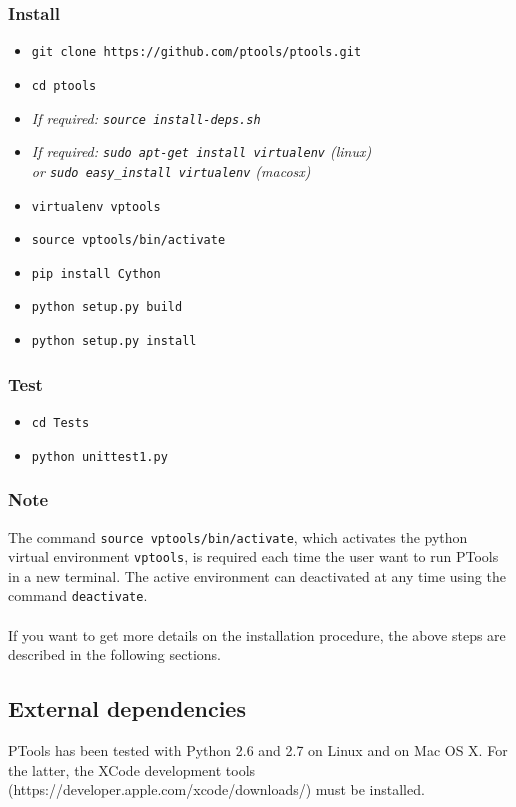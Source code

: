 \documentclass[12pt,a4paper]{article}
\begin{document}
\subsubsection*{Install}
\begin{itemize}
\item[] {\tt git clone https://github.com/ptools/ptools.git}
\item[]  {\tt cd ptools}
\item[] \textit{If required: {\tt source install-deps.sh}}
\item[] \textit{If required: {\tt sudo apt-get install virtualenv} (linux)\\ or {\tt sudo easy\_install virtualenv} (macosx)}
\item[] {\tt virtualenv vptools}
\item[] {\tt source vptools/bin/activate}
\item[] {\tt pip install Cython}
\item[] {\tt python setup.py build}
\item[] {\tt python setup.py install}
\end{itemize}

\subsubsection*{Test}
\begin{itemize}
\item[] {\tt cd Tests}
\item[] {\tt python unittest1.py}
\end{itemize}

\subsubsection*{Note}
The command {\tt source vptools/bin/activate}, which activates the python virtual environment {\tt vptools}, is required each time the user want to run PTools in a new terminal. The active environment can deactivated at any time using the command {\tt deactivate}.
\\\\
If you want to get more details on the installation procedure, the above steps are described in the following sections.

\subsection{External dependencies}

PTools has been tested with Python 2.6 and 2.7 on Linux and on Mac OS X. For the latter, the XCode development tools (https://developer.apple.com/xcode/downloads/) must be installed.
\end{document}
